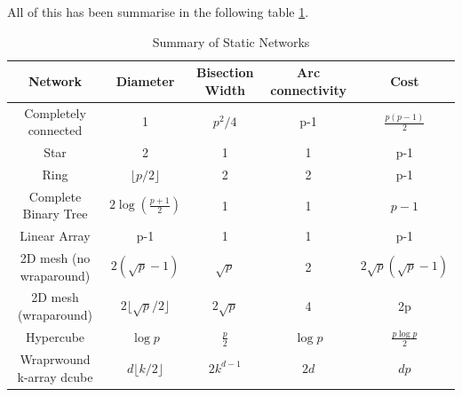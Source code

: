 \documentclass[12pt]{article}
\begin{document}
All of this has been summarise in the following table \ref{tab:static_network}. 
\begin{table}[H]
    \centering
    \begin{tabular}{|c|c|c|c|c|}
        \hline
        Network & Diameter & Bisection Width & Arc connectivity & Cost  \\
        \hline
        Completely connected & 1 & $p^2/4$ & p-1 & $\frac{p(p-1)}{2}$ \\
        Star & 2 & 1 & 1 & p-1 \\
        Ring & $\lfloor p/2 \rfloor$ & 2 & 2 & p-1 \\
        Complete Binary Tree & $2\log(\frac{p+1}{2})$ & 1 & 1 & $p-1$ \\
        Linear Array & p-1 & 1 & 1 & p-1 \\
        2D mesh (no wraparound) & $2(\sqrt{p}-1)$ & $\sqrt{p}$ & 2 & $2\sqrt{p}(\sqrt{p}-1)$ \\
        2D mesh (wraparound) & $2\lfloor\sqrt{p}/2\rfloor$ & $2\sqrt{p}$ & 4 & 2p \\
        Hypercube & $\log p$ & $\frac{p}{2}$ & $\log p$ & $\frac{p \log p}{2}$ \\
        Wraprwound k-array dcube & $d \lfloor k/2\rfloor$ & $2k^{d-1}$ & $2d$ & $dp$ \\ 
        \hline
    \end{tabular}
    \caption{Summary of Static Networks}
    \label{tab:static_network}
\end{table}

\newpage
\end{document}
